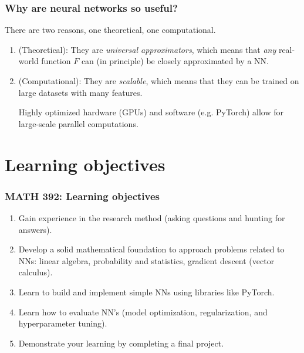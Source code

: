 \documentclass{beamer}
\theoremstyle{definition}
\begin{document}
\frame
{\frametitle{Why are neural networks so useful?}
There are two reasons, one theoretical, one computational. \vspace{0.1in} \pause
\begin{enumerate}[$\bullet$]
    \item (Theoretical): They are \emph{universal approximators}, which means that  \emph{any} real-world function $F$ can (in principle) be closely approximated by a NN. \vspace{0.2in} \pause
    \item (Computational): They are \emph{scalable}, which means that they can be trained on large datasets with many features. \vspace{0.1in} \pause
    
    Highly optimized hardware (GPUs) and software (e.g. PyTorch) allow for large-scale parallel computations.
\end{enumerate}
}
\section{Learning objectives}

\frame
{\frametitle{MATH 392: Learning objectives}

\begin{enumerate}[$\bullet$]
    \item Gain experience in the research method (asking questions and hunting for answers). \vspace{0.1in} \pause
    \item Develop a solid mathematical foundation to approach problems related to NNs: linear algebra, probability and statistics, gradient descent (vector calculus). \vspace{0.1in} \pause
    \item Learn to build and implement simple NNs using libraries like PyTorch. \vspace{0.1in} \pause
    \item Learn how to evaluate NN's (model optimization, regularization, and hyperparameter tuning). \vspace{0.1in} \pause
    \item Demonstrate your learning by completing a final project.
\end{enumerate}
}
\end{document}
